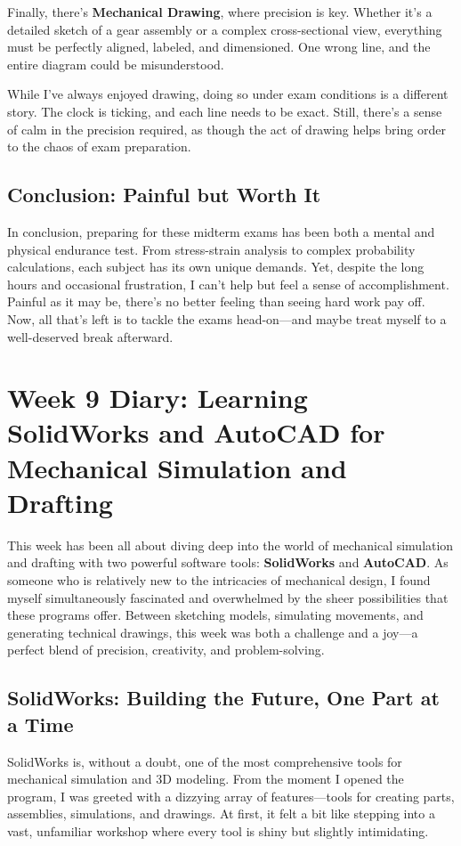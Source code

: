 \documentclass[a4paper]{article} 	%
\begin{document}
Finally, there’s \textbf{Mechanical Drawing}, where precision is key. Whether it’s a detailed sketch of a gear assembly or a complex cross-sectional view, everything must be perfectly aligned, labeled, and dimensioned. One wrong line, and the entire diagram could be misunderstood.

While I’ve always enjoyed drawing, doing so under exam conditions is a different story. The clock is ticking, and each line needs to be exact. Still, there’s a sense of calm in the precision required, as though the act of drawing helps bring order to the chaos of exam preparation.

\subsection*{Conclusion: Painful but Worth It}

In conclusion, preparing for these midterm exams has been both a mental and physical endurance test. From stress-strain analysis to complex probability calculations, each subject has its own unique demands. Yet, despite the long hours and occasional frustration, I can’t help but feel a sense of accomplishment. Painful as it may be, there’s no better feeling than seeing hard work pay off. Now, all that’s left is to tackle the exams head-on—and maybe treat myself to a well-deserved break afterward.


\section{Week 9 Diary: Learning SolidWorks and AutoCAD for Mechanical Simulation and Drafting}

This week has been all about diving deep into the world of mechanical simulation and drafting with two powerful software tools: \textbf{SolidWorks} and \textbf{AutoCAD}. As someone who is relatively new to the intricacies of mechanical design, I found myself simultaneously fascinated and overwhelmed by the sheer possibilities that these programs offer. Between sketching models, simulating movements, and generating technical drawings, this week was both a challenge and a joy—a perfect blend of precision, creativity, and problem-solving.

\subsection*{SolidWorks: Building the Future, One Part at a Time}

SolidWorks is, without a doubt, one of the most comprehensive tools for mechanical simulation and 3D modeling. From the moment I opened the program, I was greeted with a dizzying array of features—tools for creating parts, assemblies, simulations, and drawings. At first, it felt a bit like stepping into a vast, unfamiliar workshop where every tool is shiny but slightly intimidating.
\end{document}
